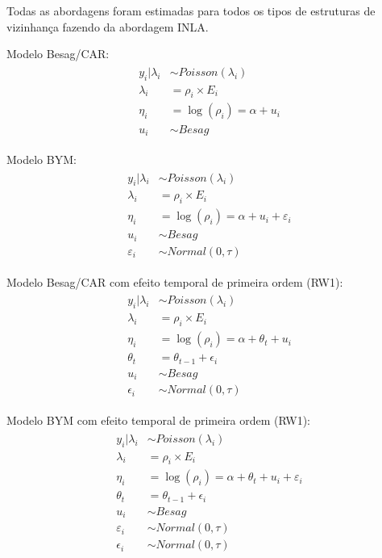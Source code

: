 \documentclass[12pt,openright,oneside,a4paper,english,french,spanish]{abntex2}
\numberwithin{table}{section} %
\numberwithin{figure}{section} %
\begin{document}
Todas as abordagens foram estimadas para todos os tipos de estruturas de vizinhança fazendo da abordagem INLA.

Modelo Besag/CAR:
\begin{align}
\label{eq:besag}
\begin{split} %
y_i|\lambda_i & \sim Poisson(\lambda_i)\\
\lambda_i & =\rho_i\times E_i\\
\eta_i & =\log (\rho_i)=\alpha + u_i\\
u_i & \sim Besag\
\end{split}
\end{align}

Modelo BYM:
\begin{align}
\label{eq:bym}
\begin{split}
y_i|\lambda_i & \sim Poisson(\lambda_i)\\
\lambda_i & =\rho_i\times E_i\\
\eta_i & =\log (\rho_i)=\alpha + u_i + \varepsilon_{i}\\
u_i & \sim Besag\\
\varepsilon_{i} & \sim Normal(0,\tau)\
\end{split}
\end{align}

Modelo Besag/CAR com efeito temporal de primeira ordem (RW1):
\begin{align}
\label{eq:besag_rw1}
\begin{split}
y_i|\lambda_i & \sim Poisson(\lambda_i)\\
\lambda_i & =\rho_i\times E_i\\
\eta_i & =\log (\rho_i)=\alpha + \theta_t + u_i\\
\theta_t & =\theta_{t-1} + \epsilon_i\\
u_i & \sim Besag\\
\epsilon_i & \sim Normal(0,\tau)\
\end{split}
\end{align}

Modelo BYM com efeito temporal de primeira ordem (RW1):
\begin{align}
\label{eq:bym_rw1}
\begin{split}
y_i|\lambda_i & \sim Poisson(\lambda_i)\\
\lambda_i & =\rho_i\times E_i\\
\eta_i & =\log (\rho_i)=\alpha + \theta_t + u_i + \varepsilon_i\\
\theta_t & =\theta_{t-1} + \epsilon_i\\
u_i & \sim Besag\\
\varepsilon_i & \sim Normal(0,\tau)\\
\epsilon_i & \sim Normal(0,\tau)\
\end{split}
\end{align}
\end{document}
